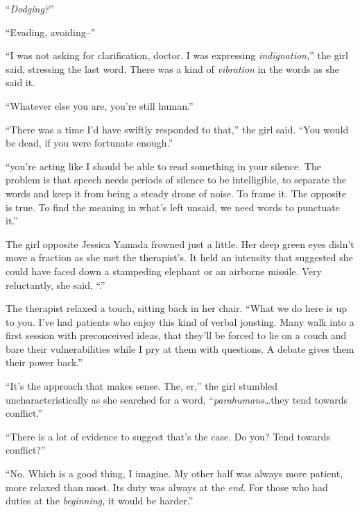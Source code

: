 ``\emph{Dodging?}''



``Evading, avoiding--''



``I was not asking for clarification, doctor.  I was expressing \emph{indignation,}'' the girl said, stressing the last word.  There was a kind of \emph{vibration} in the words as she said it.



``Whatever else you are, you're still human.''



``There was a time I'd have swiftly responded to that,'' the girl said.  ``You would be dead, if you were fortunate enough.''



``\ldotsAnd you're acting like I should be able to read something in your silence.  The problem is that speech needs periods of silence to be intelligible, to separate the words and keep it from being a steady drone of noise.  To frame it.  The opposite is true.  To find the meaning in what's left unsaid, we need words to punctuate it.''



The girl opposite Jessica Yamada frowned just a little.  Her deep green eyes didn't move a fraction as she met the therapist's.  It held an intensity that suggested she could have faced down a stampeding elephant or an airborne missile.  Very reluctantly, she said, ``\ldotsFair.''



The therapist relaxed a touch, sitting back in her chair.  ``What we do here is up to you.  I've had patients who enjoy this kind of verbal jousting.  Many walk into a first session with preconceived ideas, that they'll be forced to lie on a couch and bare their vulnerabilities while I pry at them with questions.  A debate gives them their power back.''



``It's the approach that makes sense.  The, er,'' the girl stumbled uncharacteristically as she searched for a word, ``\emph{parahumans}\ldots they tend towards conflict.''



``There is a lot of evidence to suggest that's the case.  Do you?  Tend towards conflict?''



``No.  Which is a good thing, I imagine.  My other half was always more patient, more relaxed than most.  Its duty was always at the \emph{end}.  For those who had duties at the \emph{beginning, }it would be harder.''




